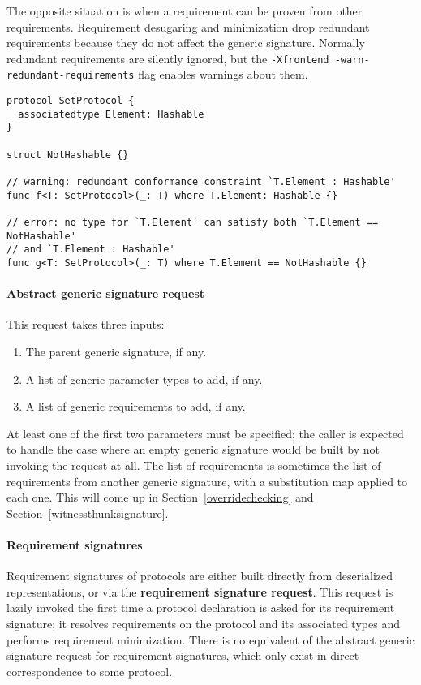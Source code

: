 \documentclass[a4paper,headsepline,bibliography=totoc,toc=flat,fleqn,twoside=semi]{scrbook}
\theoremstyle{definition}
\theoremstyle{definition}
\theoremstyle{definition}
\begin{document}
The opposite situation is when a requirement can be proven from other requirements. Requirement desugaring and minimization drop redundant requirements because they do not affect the generic signature. Normally redundant requirements are silently ignored, but the \texttt{-Xfrontend -warn-redundant-requirements} flag enables warnings about them.
\begin{Verbatim}
protocol SetProtocol {
  associatedtype Element: Hashable
}

struct NotHashable {}

// warning: redundant conformance constraint `T.Element : Hashable'
func f<T: SetProtocol>(_: T) where T.Element: Hashable {}

// error: no type for `T.Element' can satisfy both `T.Element == NotHashable'
// and `T.Element : Hashable'
func g<T: SetProtocol>(_: T) where T.Element == NotHashable {}
\end{Verbatim}

\paragraph{Abstract generic signature request}
This request takes three inputs:
\begin{enumerate}
\item The parent generic signature, if any.
\item A list of generic parameter types to add, if any.
\item A list of generic requirements to add, if any.
\end{enumerate}
At least one of the first two parameters must be specified; the caller is expected to handle the case where an empty generic signature would be built by not invoking the request at all. The list of requirements is sometimes the list of requirements from another generic signature, with a substitution map applied to each one. This will come up in Section~\ref{overridechecking} and Section~\ref{witnessthunksignature}.

\paragraph{Requirement signatures}
Requirement signatures of protocols are either built directly from deserialized representations, or via the \textbf{requirement signature request}. This request is lazily invoked the first time a protocol declaration is asked for its requirement signature; it resolves requirements on the protocol and its associated types and performs requirement minimization. There is no equivalent of the abstract generic signature request for requirement signatures, which only exist in direct correspondence to some protocol.
\fi
\end{document}
